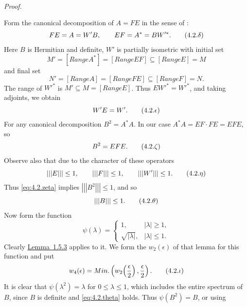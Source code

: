 \documentclass[b5paper,twoside]{article}
\newcommand{\lemref}[2]{\hyperref[#1]{\mbox{Lemma~#2}}}
\theoremstyle{mvnplain}
\renewenvironment{proof}[1][Proof]{%
  \par\addvspace{0.35\baselineskip}%
  \noindent\textit{#1.}\ \normalfont\ignorespaces
}{%
  \par\addvspace{0.35\baselineskip}%
}
\newcommand{\OpNorm}[1]{\left\lvert\left\lvert\left\lvert#1\right\rvert\right\rvert\right\rvert}
\def\operatorname#1{#1}%
\def\mathfrak#1{#1}%
\begin{document}
\begin{proof}
Form the canonical decomposition of \(A=FE\) in the sense of
\cite[p.~143, Definition~4.4.1]{ref5}:
\begin{equation}\label{eq:4.2.delta}
 FE=A=W'B,\qquad EF=A^*=BW'^*.
  \tag{4.2.\ensuremath{\delta}}
\end{equation}
Here \(B\) is Hermitian and definite, \(W'\) is partially isometric with
initial set
\[
  \mathfrak M'=[\operatorname {Range}A^*]
  =[\operatorname {Range}EF]
  \subseteq[\operatorname {Range}E]=\mathfrak M
\]
and final set
\[
  \mathfrak N'=[\operatorname {Range}A]
  =[\operatorname {Range}FE]
  \subseteq[\operatorname {Range}F]=\mathfrak N.
\]
The range of \(W'^*\) is
\(\mathfrak M'\subseteq\mathfrak M=[\operatorname {Range}E]\). Thus
\(EW'^*=W'^*\), and taking adjoints, we obtain
\begin{equation}\label{eq:4.2.epsilon}
  W'E=W'.
  \tag{4.2.\ensuremath{\epsilon}}
\end{equation}
For any canonical decomposition \(B^2=A^*A\). In our case
\(A^*A=EF\cdot FE=EFE\), so
\begin{equation}\label{eq:4.2.zeta}
  B^2=EFE.
  \tag{4.2.\ensuremath{\zeta}}
\end{equation}
Observe also that due to the character of these operators
\begin{equation}\label{eq:4.2.eta}
  \OpNorm{E}\le1,\qquad \OpNorm{F}\le1,\qquad \OpNorm{W'}\le1.
  \tag{4.2.\ensuremath{\eta}}
\end{equation}
Thus \eqref{eq:4.2.zeta} implies \(\OpNorm{B^2}\le1\), and so
\begin{equation}\label{eq:4.2.theta}
  \OpNorm{B}\le1.
  \tag{4.2.\ensuremath{\theta}}
\end{equation}
Now form the function
\[
\psi(\lambda)=
\begin{cases}
1,&|\lambda|\ge1,\\
\sqrt{|\lambda|},&|\lambda|\le1.
\end{cases}
\]
Clearly \lemref{lem:1.5.3}{1.5.3} applies to it. We form the
\(w_2(\epsilon)\) of that lemma for this function and put
\begin{equation}\label{eq:4.2.iota}
  w_4(\epsilon)=\operatorname {Min.}
  \left(w_2\!\left(\frac{\epsilon}{2}\right),\frac{\epsilon}{2}\right).
  \tag{4.2.\ensuremath{\iota}}
\end{equation}
It is clear that \(\psi(\lambda^2)=\lambda\) for \(0\le\lambda\le1\),
which includes the entire spectrum of \(B\), since \(B\) is definite and
\eqref{eq:4.2.theta} holds. Thus \(\psi(B^2)=B\), or using

\end{proof}
\end{document}
